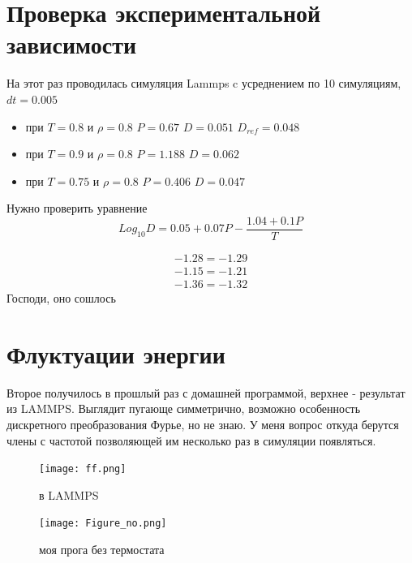\documentclass[a4paper]{article}
\begin{document}

\section{Проверка экспериментальной зависимости} %
\label{sec:проверка_экспериментальной_зависимости}
На этот раз проводилась симуляция Lammps c усреднением по 10 симуляциям, $dt = 0.005$
\begin{itemize}
    \item при $T = 0.8$ и $\rho =0.8$ $P = 0.67$ $D = 0.051$ $D_{ref} = 0.048$
    \item при $T = 0.9$ и $\rho =0.8$ $P = 1.188$ $D = 0.062$ 
    \item при $T = 0.75$ и $\rho =0.8$ $P = 0.406$ $D = 0.047$ 
\end{itemize}
Нужно проверить уравнение
\begin{equation}
    Log_{10} D = 0.05 + 0.07 P - \frac{1.04 + 0.1 P}{T}
\end{equation}


\begin{align*}
    -1.28 = -1.29\\
    -1.15 = -1.21\\
    -1.36 = -1.32
\end{align*}
Господи, оно сошлось

\newpage
\section{Флуктуации энергии} %
\label{sec:флуктуации_энергии}
Второе получилось в прошлый раз с домашней программой, верхнее - результат из LAMMPS. Выглядит пугающе симметрично, возможно особенность дискретного преобразования Фурье, но не знаю. У меня вопрос откуда берутся члены с частотой позволяющей им несколько раз в симуляции появляться.
\begin{figure}[h]
\begin{center}
\texttt{[image: ff.png]}
\caption{в LAMMPS}
\end{center}
\end{figure}
\begin{figure}[h]
\begin{center}
\texttt{[image: Figure\_no.png]}
\caption{моя прога без термостата}
\end{center}
\end{figure}


\end{document}
